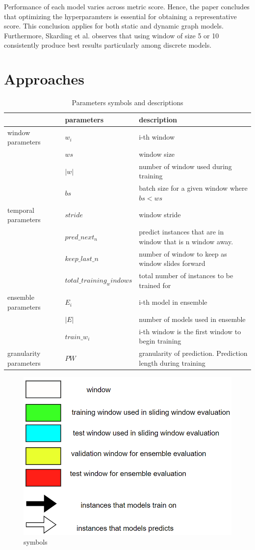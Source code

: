 \documentclass{IEEEtran}
\begin{document}
Performance of each model varies across metric score. Hence, the paper concludes that optimizing the hyperparamters is essential for obtaining a representative score. This conclusion applies for both static and dynamic graph models. Furthermore, Skarding et al. observes that using window of size 5 or 10 consistently produce best results particularly among discrete models.
\section{Approaches}
\label{sec:org894fad8}
\begin{table}[htbp]
\caption{\label{parameters}Parameters symbols and descriptions}
\centering
\begin{tabular}{lll}
\hline
\hline
 & parameters & description\\
\hline
window parameters & \(w_i\) & i-th window\\
 & \(ws\) & window size\\
 & \(\vert w \vert\) & number of window used during training\\
 & \(bs\) & batch size for a given window where \(bs < ws\)\\
temporal parameters & \(stride\) & window stride\\
 & \(pred\_next_{n}\) & predict instances that are in window that is n window away.\\
 & \(keep\_last\_n\) & number of window to keep as window slides forward\\
 & \(total\_training_windows\) & total number of instances to be trained for\\
ensemble parameters & \(E_i\) & i-th model in ensemble\\
 & \(\vert E \vert\) & number of models used in ensemble\\
 & \(train\_w_{i}\) & i-th window is the first window to begin training\\
granularity parameters & \(PW\) & granularity of prediction. Prediction length during training\\
\end{tabular}
\end{table}

\begin{figure}[htbp]
\centering
\includegraphics[width=.9\linewidth]{./images/screenshot_20220321_130824.png}
\caption{\label{symbols}symbols}
\end{figure}
\end{document}
